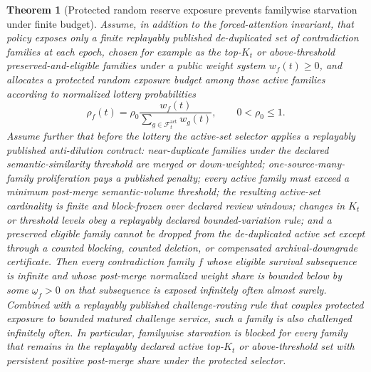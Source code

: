 \documentclass[11pt]{article}
\newtheorem{theorem}{Theorem}[section]
\theoremstyle{definition}
\newcommand{\1}{\mathbf{1}}
\begin{document}
\begin{theorem}[Protected random reserve exposure prevents familywise starvation under finite budget]\label{thm:familywise_exposure}
Assume, in addition to the forced-attention invariant, that policy exposes only a finite replayably published \emph{de-duplicated} set of contradiction families at each epoch, chosen for example as the top-$K_t$ or above-threshold preserved-and-eligible families under a public weight system $w_f(t)\ge 0$, and allocates a protected random exposure budget among those active families according to normalized lottery probabilities
\[
\rho_f(t)=\rho_0\frac{w_f(t)}{\sum_{g\in\mathcal F_t^{\mathrm{act}}} w_g(t)},\qquad 0<\rho_0\le 1.
\]
Assume further that before the lottery the active-set selector applies a replayably published anti-dilution contract: near-duplicate families under the declared semantic-similarity threshold are merged or down-weighted; one-source-many-family proliferation pays a published penalty; every active family must exceed a minimum post-merge semantic-volume threshold; the resulting active-set cardinality is finite and block-frozen over declared review windows; changes in $K_t$ or threshold levels obey a replayably declared bounded-variation rule; and a preserved eligible family cannot be dropped from the de-duplicated active set except through a counted blocking, counted deletion, or compensated archival-downgrade certificate. Then every contradiction family $f$ whose eligible survival subsequence is infinite and whose \emph{post-merge} normalized weight share is bounded below by some $\underline\omega_f>0$ on that subsequence is exposed infinitely often almost surely. Combined with a replayably published challenge-routing rule that couples protected exposure to bounded matured challenge service, such a family is also challenged infinitely often. In particular, familywise starvation is blocked for every family that remains in the replayably declared active top-$K_t$ or above-threshold set with persistent positive post-merge share under the protected selector.
\end{theorem}
\end{document}
